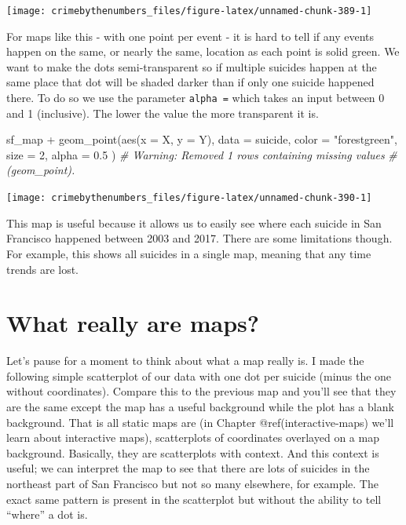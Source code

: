 \documentclass[
  a4paper,
]{krantz}
\makeatletter
\newenvironment{Shaded}{\begin{snugshade}}{\end{snugshade}}
\newcommand{\AttributeTok}[1]{\textcolor[rgb]{0.77,0.63,0.00}{#1}}
\newcommand{\CommentTok}[1]{\textcolor[rgb]{0.56,0.35,0.01}{\textit{#1}}}
\newcommand{\DecValTok}[1]{\textcolor[rgb]{0.00,0.00,0.81}{#1}}
\newcommand{\FloatTok}[1]{\textcolor[rgb]{0.00,0.00,0.81}{#1}}
\newcommand{\FunctionTok}[1]{\textcolor[rgb]{0.00,0.00,0.00}{#1}}
\newcommand{\NormalTok}[1]{#1}
\newcommand{\SpecialCharTok}[1]{\textcolor[rgb]{0.00,0.00,0.00}{#1}}
\newcommand{\StringTok}[1]{\textcolor[rgb]{0.31,0.60,0.02}{#1}}
\newenvironment{kframe}{%
\medskip{}
\setlength{\fboxsep}{.8em}
 \def\at@end@of@kframe{}%
 \ifinner\ifhmode%
  \def\at@end@of@kframe{\end{minipage}}%
  \begin{minipage}{\columnwidth}%
 \fi\fi%
 \def\FrameCommand##1{\hskip\@totalleftmargin \hskip-\fboxsep
 \colorbox{shadecolor}{##1}\hskip-\fboxsep
     \hskip-\linewidth \hskip-\@totalleftmargin \hskip\columnwidth}%
 \MakeFramed {\advance\hsize-\width
   \@totalleftmargin\z@ \linewidth\hsize
   \@setminipage}}%
 {\par\unskip\endMakeFramed%
 \at@end@of@kframe}
\renewenvironment{Shaded}{\begin{kframe}}{\end{kframe}}
\makeatother
\begin{document}
\begin{center}\texttt{[image: crimebythenumbers\_files/figure-latex/unnamed-chunk-389-1]} \end{center}

For maps like this - with one point per event - it is hard
to tell if any events happen on the same, or nearly the
same, location as each point is solid green. We want to make
the dots semi-transparent so if multiple suicides happen at
the same place that dot will be shaded darker than if only
one suicide happened there. To do so we use the parameter
\texttt{alpha\ =} which takes an input between 0 and 1
(inclusive). The lower the value the more transparent it is.

\begin{Shaded}
\begin{Highlighting}[]
\NormalTok{sf\_map }\SpecialCharTok{+}
  \FunctionTok{geom\_point}\NormalTok{(}\FunctionTok{aes}\NormalTok{(}\AttributeTok{x =}\NormalTok{ X, }\AttributeTok{y =}\NormalTok{ Y),}
    \AttributeTok{data  =}\NormalTok{ suicide,}
    \AttributeTok{color =} \StringTok{"forestgreen"}\NormalTok{,}
    \AttributeTok{size  =} \DecValTok{2}\NormalTok{,}
    \AttributeTok{alpha =} \FloatTok{0.5}
\NormalTok{  )}
\CommentTok{\# Warning: Removed 1 rows containing missing values}
\CommentTok{\# (geom\_point).}
\end{Highlighting}
\end{Shaded}

\begin{center}\texttt{[image: crimebythenumbers\_files/figure-latex/unnamed-chunk-390-1]} \end{center}

This map is useful because it allows us to easily see where
each suicide in San Francisco happened between 2003 and
2017. There are some limitations though. For example, this
shows all suicides in a single map, meaning that any time
trends are lost.

\hypertarget{what-really-are-maps}{%
\section{What really are maps?}\label{what-really-are-maps}}

Let's pause for a moment to think about what a map really
is. I made the following simple scatterplot of our data with
one dot per suicide (minus the one without coordinates).
Compare this to the previous map and you'll see that they
are the same except the map has a useful background while
the plot has a blank background. That is all static maps are
(in Chapter @ref(interactive-maps) we'll learn about
interactive maps), scatterplots of coordinates overlayed on
a map background. Basically, they are scatterplots with
context. And this context is useful; we can interpret the
map to see that there are lots of suicides in the northeast
part of San Francisco but not so many elsewhere, for
example. The exact same pattern is present in the
scatterplot but without the ability to tell ``where'' a dot
is.
\end{document}

